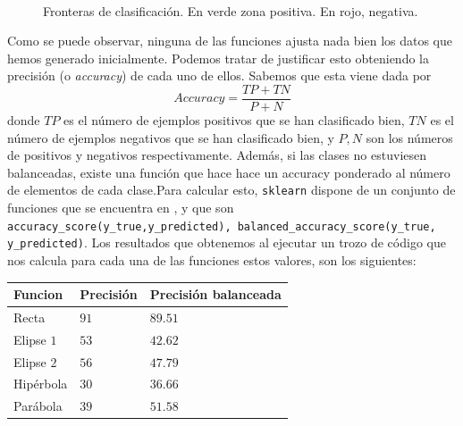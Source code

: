 \documentclass[12pt]{article}
\begin{document}
{\begin{figure}[H]
  \centering
  \qquad
  \\
  \qquad%
  \caption{Fronteras de clasificación. En verde zona positiva. En rojo, negativa.}
  \label{fig:myfig}
\end{figure}

Como se puede observar, ninguna de las funciones ajusta nada bien los datos que hemos generado inicialmente. Podemos tratar de justificar esto obteniendo la precisión (o \emph{accuracy}) de cada uno de ellos. Sabemos que esta viene dada por 
$$
Accuracy = \frac{TP + TN}{P + N}
$$
donde $TP$ es el número de ejemplos positivos que se han clasificado bien, $TN$ es el número de ejemplos negativos que se han clasificado bien, y $P,N$ son los números de positivos y negativos respectivamente. Además, si las clases no estuviesen balanceadas, existe una función que hace hace un accuracy ponderado al número de elementos de cada clase.Para calcular esto, \lstinline{sklearn} dispone de un conjunto de funciones que se encuentra en , y que son \lstinline{accuracy_score(y_true,y_predicted), balanced_accuracy_score(y_true, y_predicted)}. Los resultados que obtenemos al ejecutar un trozo de código que nos calcula para cada una de las funciones estos valores, son los siguientes:

\begin{table}[H]
  \centering
  \begin{tabular}{|l|l|l|}
  \hline
  Funcion    & Precisión & Precisión balanceada \\ \hline
  Recta      & $91$      & $89.51$              \\ \hline
  Elipse $1$ & $53$      & $42.62$              \\ \hline
  Elipse $2$ & $56$      & $47.79$              \\ \hline
  Hipérbola  & $30$      & $36.66$              \\ \hline
  Parábola   & $39$      & $51.58$              \\ \hline
  \end{tabular}
  \end{table}


}
\end{document}
